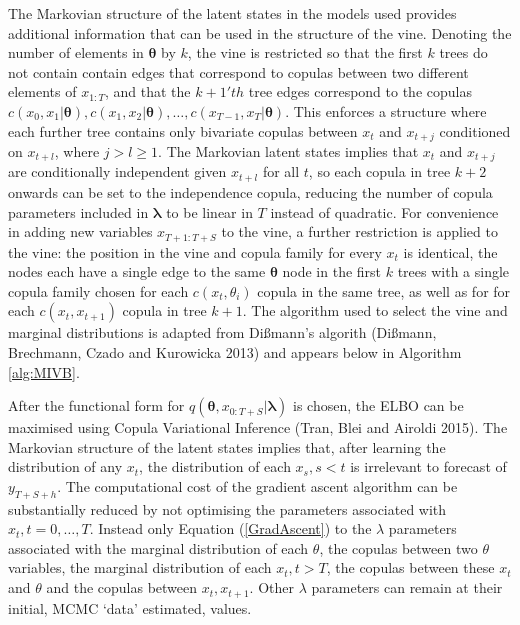 \documentclass[12pt,a4paper]{article}%
\numberwithin{equation}{section}
\begin{document}
{{The Markovian structure of the latent states in the models used provides additional information that can be used in the structure of the vine. Denoting the number of elements in $\boldsymbol{\theta}$ by $k$, the vine is restricted so that the first $k$ trees do not contain contain edges that correspond to copulas between two different elements of $x_{1:T}$, and that the $k+1'th$ tree edges correspond to the copulas $c(x_0, x_1 | \boldsymbol{\theta}), c(x_1, x_2 | \boldsymbol{\theta}), \dots, c(x_{T-1}, x_T | \boldsymbol{\theta})$. This enforces a structure where each further tree contains only bivariate copulas between $x_t$ and $x_{t+j}$ conditioned on $x_{t+l}$, where $j > l \geq 1$. The Markovian latent states implies that $x_t$ and $x_{t+j}$ are conditionally independent given $x_{t+l}$ for all $t$, so each copula in tree $k+2$ onwards can be set to the independence copula, reducing the number of copula parameters included in $\boldsymbol{\lambda}$ to be linear in $T$ instead of quadratic. For convenience in adding new variables $x_{T+1:T+S}$ to the vine, a further restriction is applied to the vine: the position in the vine and copula family for every $x_t$ is identical, the nodes each have a single edge to the same $\boldsymbol{\theta}$ node in the first $k$ trees with a single copula family chosen for each $c(x_t, \theta_i)$ copula in the same tree, as well as for for each $c(x_t, x_{t+1})$ copula in tree $k+1$. The algorithm used to select the vine and marginal distributions is adapted from Di{\ss}mann's algorith (Di{\ss}mann, Brechmann, Czado and Kurowicka 2013) and appears below in Algorithm \ref{alg:MIVB}.

After the functional form for $q(\boldsymbol{\theta}, x_{0:T+S} | \boldsymbol{\lambda})$ is chosen, the ELBO can be maximised using Copula Variational Inference (Tran, Blei and Airoldi 2015). The Markovian structure of the latent states implies that, after learning the distribution of any $x_t$, the distribution of each $x_s, s < t$ is irrelevant to forecast of $y_{T+S+h}$. The computational cost of the gradient ascent algorithm can be substantially reduced by not optimising the parameters associated with $x_t, t = 0, \dots, T$. Instead only Equation (\ref{GradAscent}) to the $\lambda$ parameters associated with the marginal distribution of each $\theta$, the copulas between two $\theta$ variables, the marginal distribution of each $x_t, t > T$, the copulas between these $x_t$ and $\theta$ and the copulas between $x_t, x_{t+1}$. Other $\lambda$ parameters can remain at their initial, MCMC `data' estimated, values.

}}
\end{document}
